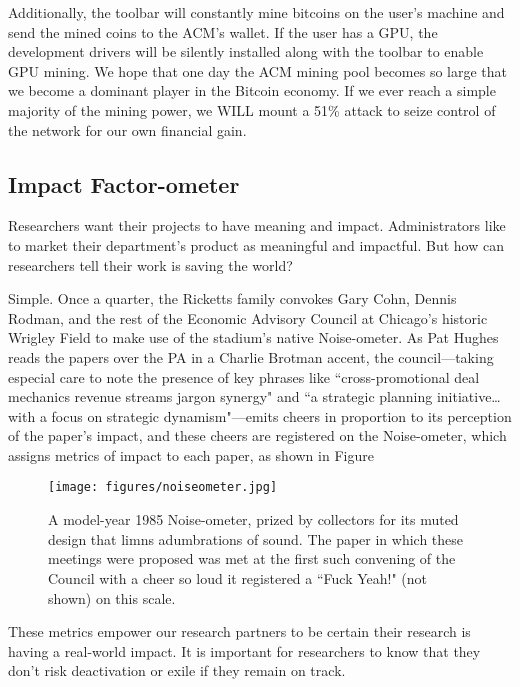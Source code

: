 Additionally, the toolbar will constantly mine bitcoins on the user's machine
and send the mined coins to the ACM's wallet.
If the user has a GPU, the development drivers will be silently installed along
with the toolbar to enable GPU mining.
We hope that one day the ACM mining pool becomes so large that we become a
dominant player in the Bitcoin economy.
If we ever reach a simple majority of the mining power, we WILL mount a 51\%
attack to seize control of the network for our own financial gain.

\subsection{Impact Factor-ometer}

Researchers want their projects to have meaning and impact. Administrators like to market their department's product as meaningful and impactful. But how can researchers tell their work is saving the world?

Simple. Once a quarter, the Ricketts family convokes Gary Cohn, Dennis Rodman, and the rest of the Economic Advisory Council at Chicago's historic Wrigley Field to make use of the stadium's native Noise-ometer. As Pat Hughes reads the papers over the PA in a Charlie Brotman accent, the council---taking especial care to note the presence of key phrases like ``cross-promotional deal mechanics revenue streams jargon synergy" and ``a strategic planning initiative\ldots with a focus on strategic dynamism"---emits cheers in proportion to its perception of the paper's impact, and these cheers are registered on the Noise-ometer, which assigns metrics of impact to each paper, as shown in Figure 

\begin{figure}
  \centering
  \texttt{[image: figures/noiseometer.jpg]}
  \caption{A model-year 1985 Noise-ometer, prized by collectors for its muted design that limns adumbrations of sound. The paper in which these meetings were proposed was met at the first such convening of the Council with a cheer so loud it registered a ``Fuck Yeah!" (not shown) on this scale.}
  \label{fig:vr-mill}
\end{figure}

These metrics empower our research partners to be certain their research is having a real-world impact.  It is important for researchers to know that they don't risk deactivation or exile if they remain on track.